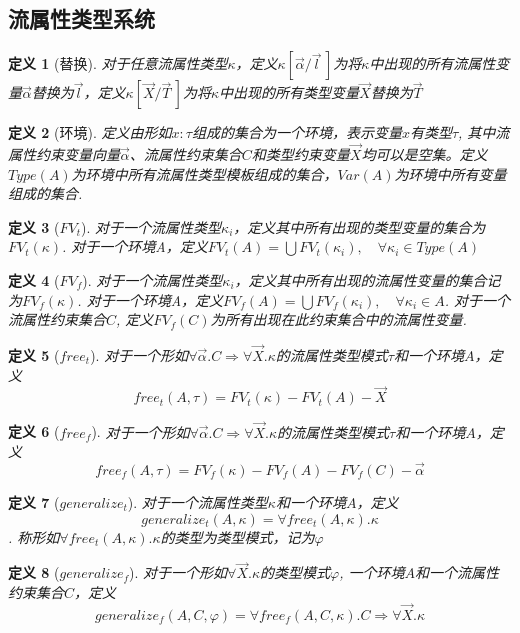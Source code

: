 \documentclass[12pt, titlepage]{article}
\newtheorem{definition}{定义}
\begin{document}
\subsection{流属性类型系统}
	\begin{definition}[替换]
		对于任意流属性类型$\kappa$，定义$\kappa[\vec{\alpha}/\vec{l}\,]$为将$\kappa$中出现的所有流属性变量$\vec{\alpha}$替换为$\vec{l}$，定义$\kappa[\vec{X}/\vec{T}\,]$为将$\kappa$中出现的所有类型变量$\vec{X}$替换为$\vec{T}$
	\end{definition}
	\begin{definition}[环境]
		定义由形如$x:\tau$组成的集合为一个环境，表示变量$x$有类型$\tau$, 其中流属性约束变量向量$\vec{\alpha}$、流属性约束集合$C$和类型约束变量$\vec{X}$均可以是空集。定义$Type(A)$为环境中所有流属性类型模板组成的集合，$Var(A)$为环境中所有变量组成的集合.
	\end{definition}
	\begin{definition}[$FV_t$]
		对于一个流属性类型$\kappa_i$，定义其中所有出现的类型变量的集合为$FV_t(\kappa)$. 对于一个环境A，定义$FV_t(A) = \bigcup FV_t(\kappa_i),\quad \forall\kappa_i\in Type(A)$
	\end{definition}
	\begin{definition}[$FV_f$]
		对于一个流属性类型$\kappa_i$，定义其中所有出现的流属性变量的集合记为$FV_f(\kappa)$. 对于一个环境A，定义$FV_f(A) = \bigcup FV_f(\kappa_i),\quad \forall\kappa_i\in A$. 对于一个流属性约束集合$C$, 定义$FV_f(C)$为所有出现在此约束集合中的流属性变量.
	\end{definition}
	\begin{definition}[$free_t$]
		对于一个形如$\forall\vec{\alpha}.C\Rightarrow \forall\vec{X}.\kappa$的流属性类型模式$\tau$和一个环境$A$，定义$$free_t(A, \tau) = FV_t(\kappa) - FV_t(A) - \vec{X}$$
	\end{definition}
	\begin{definition}[$free_f$]
		对于一个形如$\forall\vec{\alpha}.C\Rightarrow \forall\vec{X}.\kappa$的流属性类型模式$\tau$和一个环境$A$，定义$$free_f(A, \tau) = FV_f(\kappa) - FV_f(A) - FV_f(C) - \vec{\alpha}$$
	\end{definition}
	\begin{definition}[$generalize_t$]
		对于一个流属性类型$\kappa$和一个环境$A$，定义$$generalize_t(A, \kappa) = \forall free_t(A, \kappa).\kappa$$. 称形如$\forall free_t(A, \kappa).\kappa$的类型为类型模式，记为$\varphi$
	\end{definition}
	\begin{definition}[$generalize_f$]
		对于一个形如$\forall\vec{X}.\kappa$的类型模式$\varphi$, 一个环境$A$和一个流属性约束集合$C$，定义$$generalize_f(A, C, \varphi) = \forall free_f(A, C, \kappa).C\Rightarrow\forall\vec{X}.\kappa$$
	\end{definition}
\end{document}

